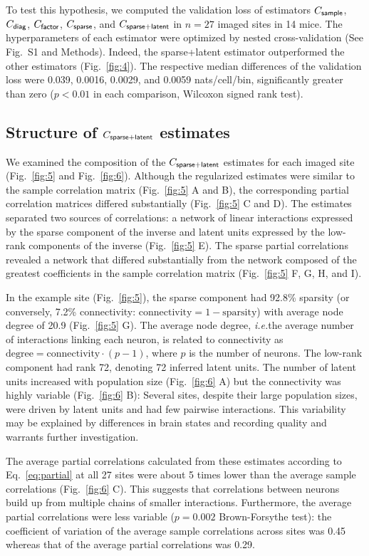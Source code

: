 To test this hypothesis, we computed the validation loss of estimators $C_{\sf sample}$, $C_{\sf diag}$, $C_{\sf factor}$, $C_{\sf sparse}$, and $C_{\sf sparse+latent}$ in $n=27$ imaged sites in 14 mice.  The hyperparameters of each estimator were optimized by nested cross-validation (See Fig.~S1 and  Methods). Indeed, the sparse+latent estimator outperformed the other estimators (Fig.~\ref{fig:4}). The respective median differences of the validation loss were 0.039, 0.0016, 0.0029, and 0.0059 nats/cell/bin, significantly greater than zero ($p<0.01$ in each comparison, Wilcoxon signed rank test).

\subsection*{Structure of $C_{\sf sparse+latent}$ estimates}
We examined the composition of the $C_{\sf sparse+latent}$ estimates for each imaged site (Fig.~\ref{fig:5} and Fig.~\ref{fig:6}). Although the regularized estimates were similar to the sample correlation matrix (Fig.~\ref{fig:5} A and B), the corresponding partial correlation matrices differed substantially (Fig.~\ref{fig:5} C and D). The estimates separated two sources of correlations: a network of linear interactions expressed by the sparse component of the inverse and latent units expressed by the low-rank components of the inverse (Fig.~\ref{fig:5} E). The sparse partial correlations revealed a network that differed substantially from the network composed of the greatest coefficients in the sample correlation matrix (Fig.~\ref{fig:5} F, G, H, and I).

In the example site (Fig.~\ref{fig:5}), the sparse component had 92.8\% sparsity (or conversely, 7.2\% connectivity: $\mbox{connectivity}=1-\mbox{sparsity}$) with average node degree of 20.9 (Fig.~\ref{fig:5} G). The average node degree, \emph{i.e.}\;the average number of interactions linking each neuron, is related to connectivity as $\mbox{degree} = \mbox{connectivity}\cdot(p-1)$, where $p$ is the number of neurons. The low-rank component had rank 72, denoting 72 inferred latent units. The number of latent units increased with population size (Fig.~\ref{fig:6} A) but the connectivity was highly variable (Fig.~\ref{fig:6} B): Several sites, despite their large population sizes, were driven by latent units and had few pairwise interactions. This variability may be explained by differences in brain states and recording quality and warrants further investigation.

The average partial correlations calculated from these estimates according to Eq.~\ref{eq:partial} at all 27 sites were about 5 times lower than the average sample correlations (Fig.~\ref{fig:6} C). This suggests that correlations between neurons build up from multiple chains of smaller interactions. Furthermore, the average partial correlations were less variable ($p=0.002$ Brown-Forsythe test): the coefficient of variation of the average sample correlations across sites was 0.45 whereas that of the average partial correlations was 0.29.

